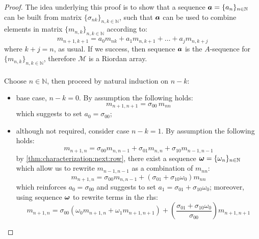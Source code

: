 \begin{proof}
    The idea underlying this proof is to show that a sequence 
    $\boldsymbol{a}=\lbrace a_{n}\rbrace_{n\in\mathbb{N}}$ can be built from
    matrix $\lbrace \sigma_{nk}\rbrace_{n,k\in\mathbb{N}}$,
    such that $\boldsymbol{a}$ can be used to combine elements in matrix
    $\lbrace m_{n,k}\rbrace_{n,k\in\mathbb{N}}$ according to: 
    \begin{displaymath}
        m_{n+1,k+1}=a_{0}m_{nk}+a_{1}m_{n,k+1}+\ldots+a_{j}m_{n,k+j}
    \end{displaymath}
    where $k+j=n$, as usual.  If we success, then sequence $\boldsymbol{a}$ is the $A$-sequence for 
    $\lbrace m_{n,k}\rbrace_{n,k\in\mathbb{N}}$, therefore $\mathcal{M}$ is a Riordan array.
    \\\\
    Choose $n\in\mathbb{N}$, then proceed by natural induction on $n-k$:
    \begin{itemize}
        \item base case, $n-k=0$. By assumption the following holds:
            \begin{displaymath}
                m_{n+1,n+1}=\sigma_{00}\,m_{nn}
            \end{displaymath}
            which suggests to set $a_{0}=\sigma_{00}$;
        \item although not required, consider case $n-k=1$. By assumption the following holds:
            \begin{displaymath}
                m_{n+1,n}=\sigma_{00}m_{n,n-1}+\sigma_{01}m_{n,n}+\sigma_{10}m_{n-1,n-1}
            \end{displaymath}
            by \autoref{thm:characterization:next:row}, there exist a sequence $\boldsymbol{\omega}=
            \lbrace \omega_{n}\rbrace_{n\in\mathbb{N}}$ which allow us to rewrite $m_{n-1,n-1}$
            as a combination of $m_{nn}$:
            \begin{displaymath}
                m_{n+1,n}=\sigma_{00}m_{n,n-1}+\left(\sigma_{01}+\sigma_{10}\omega_{0}\right)m_{nn}
            \end{displaymath}
            which reinforces $a_{0}=\sigma_{00}$ and suggests to set 
            $a_{1}=\sigma_{01}+\sigma_{10}\omega_{0}$; moreover, using sequence $\boldsymbol{\omega}$
            to rewrite terms in the \ac{rhs}:
            \begin{displaymath}
                m_{n+1,n}=\sigma_{00}\left(\omega_{0}m_{n+1,n}+\omega_{1}m_{n+1,n+1}\right)+
                    \left(\frac{\sigma_{01}+\sigma_{10}\omega_{0}}{\sigma_{00}}\right)m_{n+1,n+1}

\end{displaymath}
\end{itemize}
\end{proof}
